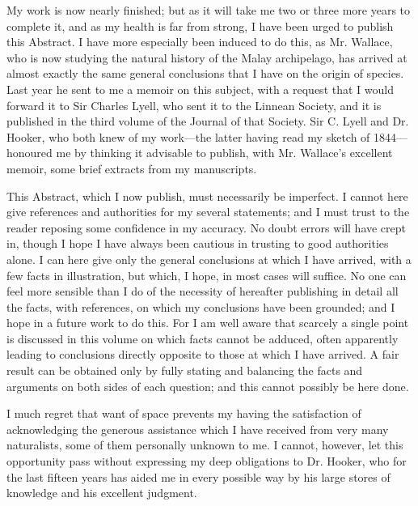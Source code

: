 \documentclass{book}
\begin{document}
My work is now nearly finished; but as it will take me two or three more years
to complete it, and as my health is far from strong, I have been urged to
publish this Abstract. I have more especially been induced to do this, as Mr.
Wallace, who is now studying the
natural history of the Malay archipelago, has arrived at almost exactly the
same general conclusions that I have on the origin of species. Last year he
sent to me a memoir on this subject, with a request that I would forward it to
Sir Charles Lyell, who sent it to the Linnean Society, and it is published in
the third volume of the Journal of that Society. Sir C. Lyell and Dr. Hooker,
who both knew of my work---the latter having read my sketch of
1844---honoured me by thinking it advisable to publish, with Mr.
Wallace's excellent memoir, some brief extracts from my manuscripts.

This Abstract, which I now publish, must necessarily be imperfect. I cannot
here give references and authorities for my several statements; and I must
trust to the reader reposing some confidence in my accuracy. No doubt errors
will have crept in, though I hope I have always been cautious in trusting to
good authorities alone. I can here give only the general conclusions at which I
have arrived, with a few facts in illustration, but which, I hope, in most
cases will suffice. No one can feel more sensible than I do of the necessity of
hereafter publishing in detail all the facts, with references, on which my
conclusions have been grounded; and I hope in a future work to do this. For I
am well aware that scarcely a single point is discussed in this volume on which
facts cannot be adduced, often apparently leading to conclusions directly
opposite to those at which I have arrived. A fair result can be obtained only
by fully stating and balancing the facts and arguments on both sides of each
question; and this cannot possibly be here done.

I much regret that want of space prevents my having the satisfaction of
acknowledging the generous assistance which I have received from very many
naturalists, some of them personally unknown to me. I cannot, however,
let this opportunity pass without expressing my deep obligations to Dr. Hooker,
who for the last fifteen years has aided me in every possible way by his large
stores of knowledge and his excellent judgment.
\end{document}

